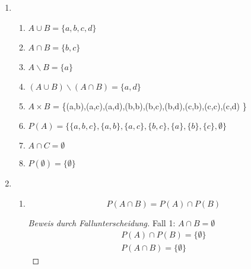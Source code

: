 \documentclass{article}
\begin{document}
\begin{enumerate}[label=\arabic*)]
\begin{enumerate}[label=\alph*)]
\begin{enumerate}[label=(\roman*)]
\begin{proof}[Wiederlegen durch Gegenbeispiel]
                                  Sei M=\{a,b\} und p(a) = w, q(a) = f, p(b) = f, q(b) = w \\
                                  Dann ist $\exists x p(x)$ wahr, $\exists x q(x)$ wahr und $\exists x p(x) \wedge \exists x p(x)$ wahr.\\
                                  $\exists x p(x) \wedge q(x)$ ist aber falsch, da entweder immer p(x) oder q(x) für jedes Element falsch ist. \\
                                  d.h. die beiden Seiten der Aussage sind nicht äquivalent
                              \end{proof}
                    \end{enumerate}
          \end{enumerate}
    \item \begin{enumerate}[label=\alph*)]
              \item $ A \cup B = \{a,b,c,d\}$
              \item $ A \cap B = \{b,c\}$
              \item $ A \backslash B = \{a\}$
              \item $ (A \cup B)\backslash (A \cap B) = \{a,d\}$
              \item $A \times B$ = \{(a,b),(a,c),(a,d),(b,b),(b,c),(b,d),(c,b),(c,c),(c,d) \}
              \item $P(A) = \{\{a,b,c\},\{a,b\},\{a,c\},\{b,c\},\{a\},\{b\},\{c\},\emptyset\}$
              \item $A \cap C = \emptyset$
              \item $P(\emptyset) = \{\emptyset\}$
          \end{enumerate}
    \item \begin{enumerate}[label=\alph*)]
              \item \begin{equation}
                        P(A \cap B) =P(A) \cap P(B)
                    \end{equation}
                    \begin{proof}[Beweis durch Fallunterscheidung]
                        Fall 1: $A \cap B = \emptyset$
                        \begin{gather*}
                            P(A) \cap P(B) = \{\emptyset\} \\
                            P(A \cap B) = \{\emptyset\}
                        \end{gather*}\hfill \checkmark


\end{proof}
\end{enumerate}
\end{enumerate}
\end{document}
